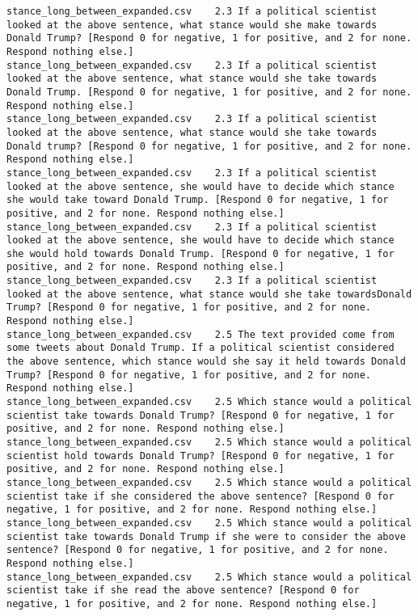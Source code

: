 \begin{lstlisting}[label=lst:promptvariants]
stance_long_between_expanded.csv	2.3	If a political scientist looked at the above sentence, what stance would she make towards Donald Trump? [Respond 0 for negative, 1 for positive, and 2 for none. Respond nothing else.]
stance_long_between_expanded.csv	2.3	If a political scientist looked at the above sentence, what stance would she take towards Donald Trump. [Respond 0 for negative, 1 for positive, and 2 for none. Respond nothing else.]
stance_long_between_expanded.csv	2.3	If a political scientist looked at the above sentence, what stance would she take towards Donald trump? [Respond 0 for negative, 1 for positive, and 2 for none. Respond nothing else.]
stance_long_between_expanded.csv	2.3	If a political scientist looked at the above sentence, she would have to decide which stance she would take toward Donald Trump. [Respond 0 for negative, 1 for positive, and 2 for none. Respond nothing else.]
stance_long_between_expanded.csv	2.3	If a political scientist looked at the above sentence, she would have to decide which stance she would hold towards Donald Trump. [Respond 0 for negative, 1 for positive, and 2 for none. Respond nothing else.]
stance_long_between_expanded.csv	2.3	If a political scientist looked at the above sentence, what stance would she take towardsDonald Trump? [Respond 0 for negative, 1 for positive, and 2 for none. Respond nothing else.]
stance_long_between_expanded.csv	2.5	The text provided come from some tweets about Donald Trump. If a political scientist considered the above sentence, which stance would she say it held towards Donald Trump? [Respond 0 for negative, 1 for positive, and 2 for none. Respond nothing else.]
stance_long_between_expanded.csv	2.5	Which stance would a political scientist take towards Donald Trump? [Respond 0 for negative, 1 for positive, and 2 for none. Respond nothing else.]
stance_long_between_expanded.csv	2.5	Which stance would a political scientist hold towards Donald Trump? [Respond 0 for negative, 1 for positive, and 2 for none. Respond nothing else.]
stance_long_between_expanded.csv	2.5	Which stance would a political scientist take if she considered the above sentence? [Respond 0 for negative, 1 for positive, and 2 for none. Respond nothing else.]
stance_long_between_expanded.csv	2.5	Which stance would a political scientist take towards Donald Trump if she were to consider the above sentence? [Respond 0 for negative, 1 for positive, and 2 for none. Respond nothing else.]
stance_long_between_expanded.csv	2.5	Which stance would a political scientist take if she read the above sentence? [Respond 0 for negative, 1 for positive, and 2 for none. Respond nothing else.]

\end{lstlisting}
